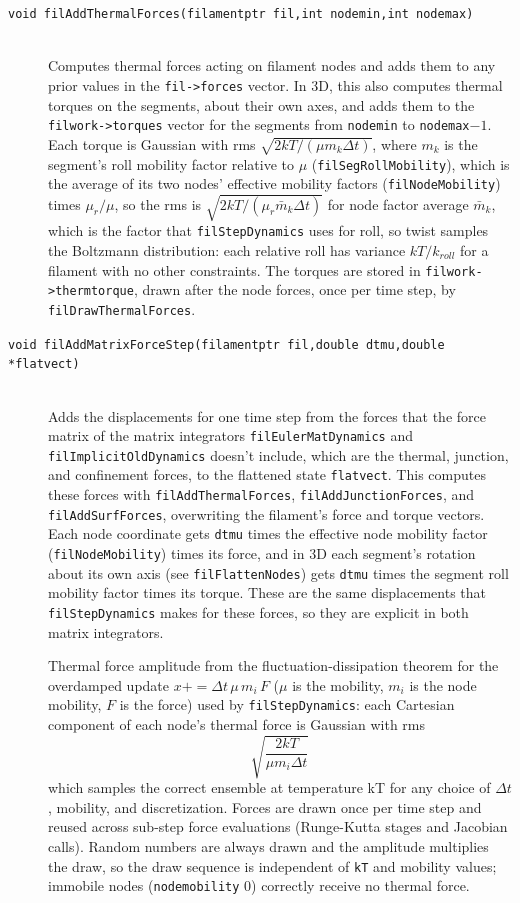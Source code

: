 \documentclass {scrbook}
\newcommand {\ttt} {\texttt}
\begin{document}
\begin{description}
\item[\ttt{void filAddThermalForces(filamentptr fil,int nodemin,int nodemax)}] %
\hfill \\
Computes thermal forces acting on filament nodes and adds them to any prior values in the \ttt{fil->forces} vector. In 3D, this also computes thermal torques on the segments, about their own axes, and adds them to the \ttt{filwork->torques} vector for the segments from \ttt{nodemin} to \ttt{nodemax}$-1$. Each torque is Gaussian with rms $\sqrt{2kT/(\mu m_k \Delta t)}$, where $m_k$ is the segment's roll mobility factor relative to $\mu$ (\ttt{filSegRollMobility}), which is the average of its two nodes' effective mobility factors (\ttt{filNodeMobility}) times $\mu_r/\mu$, so the rms is $\sqrt{2kT/(\mu_r \bar{m}_k \Delta t)}$ for node factor average $\bar{m}_k$, which is the factor that \ttt{filStepDynamics} uses for roll, so twist samples the Boltzmann distribution: each relative roll has variance $kT/k_{roll}$ for a filament with no other constraints. The torques are stored in \ttt{filwork->thermtorque}, drawn after the node forces, once per time step, by \ttt{filDrawThermalForces}.

\item[\ttt{void filAddMatrixForceStep(filamentptr fil,double dtmu,double *flatvect)}]
\hfill \\
Adds the displacements for one time step from the forces that the force matrix of the matrix integrators \ttt{filEulerMatDynamics} and \ttt{filImplicitOldDynamics} doesn't include, which are the thermal, junction, and confinement forces, to the flattened state \ttt{flatvect}. This computes these forces with \ttt{filAddThermalForces}, \ttt{filAddJunctionForces}, and \ttt{filAddSurfForces}, overwriting the filament's force and torque vectors. Each node coordinate gets \ttt{dtmu} times the effective node mobility factor (\ttt{filNodeMobility}) times its force, and in 3D each segment's rotation about its own axis (see \ttt{filFlattenNodes}) gets \ttt{dtmu} times the segment roll mobility factor times its torque. These are the same displacements that \ttt{filStepDynamics} makes for these forces, so they are explicit in both matrix integrators.

Thermal force amplitude from the fluctuation-dissipation theorem for the overdamped update $x += \Delta t\,\mu\,m_i\,F$ ($\mu$ is the mobility, $m_i$ is the node mobility, $F$ is the force) used by \ttt{filStepDynamics}: each Cartesian component of each node's thermal force is Gaussian with rms
$$\sqrt{\frac{2kT}{\mu m_i \Delta t}}$$
which samples the correct ensemble at temperature kT for any choice of $\Delta t$, mobility, and discretization. Forces are drawn once per time step and reused across sub-step force evaluations (Runge-Kutta stages and Jacobian calls). Random numbers are always drawn and the amplitude multiplies the draw, so the draw sequence is independent of \ttt{kT} and mobility values; immobile nodes (\ttt{nodemobility} 0) correctly receive no thermal force.


\end{description}
\end{document}

